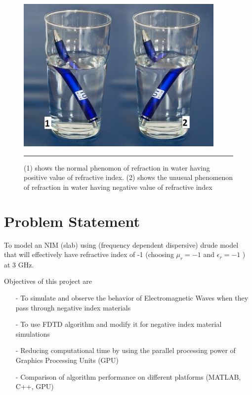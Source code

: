 \begin{figure}[htbp]
	\centering
		\includegraphics[width=4in]{Pictures/glass.jpg}
		\rule{35em}{0.5pt}
	\caption[Illustration of NIM]{(1) shows the normal phenomon of refraction in water having positive value of refractive index. (2) shows the unusual phenomenon of refraction in water having negative value of refractive index}
	\label{fig:glass}
\end{figure}



\section{Problem Statement}

To model an NIM (slab) using (frequency dependent dispersive) drude model that will effectively have refractive index of -1 (choosing $\mu_{r} = -1$ and $\epsilon_{r} = -1$ ) at 3 GHz.

Objectives of this project are 
\begin{itemize}
\item[-] To simulate and observe the behavior of Electromagnetic Waves when they pass through negative index materials
\item[-] To use FDTD algorithm and modify it for negative index material simulations
\item[-] Reducing computational time by using the parallel processing power of Graphics Processing Units (GPU)
\item[-] Comparison of algorithm performance on different platforms (MATLAB, C++, GPU)
\end{itemize}


